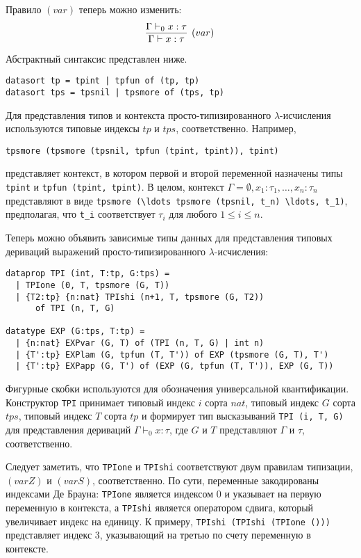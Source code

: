 Правило $(var)$ теперь можно изменить:
$$
\infer[(var)]{\Gamma \vdash x:\tau}{\Gamma \vdash_0 x:\tau}
$$

Абстрактный синтаксис представлен ниже.

\begin{lstlisting}[basicstyle=\small]
datasort tp = tpint | tpfun of (tp, tp)
datasort tps = tpsnil | tpsmore of (tps, tp)
\end{lstlisting}

Для представления типов и контекста просто-типизированного $\lambda$-исчисления используются типовые индексы $tp$ и $tps$, соответственно. Например,
\begin{lstlisting}
tpsmore (tpsmore (tpsnil, tpfun (tpint, tpint)), tpint)
\end{lstlisting}
представляет контекст, в котором первой и второй переменной назначены типы \lstinline!tpint! и \lstinline!tpfun (tpint, tpint)!. В целом, контекст $\Gamma = \emptyset, x_1:\tau_1, \ldots, x_n:\tau_n$ представляют в виде \lstinline!tpsmore (\ldots tpsmore (tpsnil, t_n) \ldots, t_1)!, предполагая, что \lstinline!t_i! соответствует $\tau_i$ для любого $1 \leq i \leq n$.

Теперь можно объявить зависимые типы данных для представления типовых дериваций выражений просто-типизированного $\lambda$-исчисления:

\begin{lstlisting}
dataprop TPI (int, T:tp, G:tps) =
  | TPIone (0, T, tpsmore (G, T))
  | {T2:tp} {n:nat} TPIshi (n+1, T, tpsmore (G, T2))
      of TPI (n, T, G)

datatype EXP (G:tps, T:tp) =
  | {n:nat} EXPvar (G, T) of (TPI (n, T, G) | int n)
  | {T':tp} EXPlam (G, tpfun (T, T')) of EXP (tpsmore (G, T), T')
  | {T':tp} EXPapp (G, T') of (EXP (G, tpfun (T, T')), EXP (G, T))
\end{lstlisting}

Фигурные скобки используются для обозначения универсальной квантификации. Конструктор \lstinline!TPI! принимает типовый индекс $i$ сорта $nat$, типовый индекс $G$ сорта $tps$, типовый индекс $T$ сорта $tp$ и формирует тип высказываний \lstinline!TPI (i, T, G)! для представления дериваций $\Gamma \vdash_0 x:\tau$, где $G$ и $T$ представляют $\Gamma$ и $\tau$, соответственно.

Следует заметить, что \lstinline!TPIone! и \lstinline!TPIshi! соответствуют двум правилам типизации, $(varZ)$ и $(varS)$, соответственно. По сути, переменные закодированы индексами Де Брауна: \lstinline!TPIone! является индексом 0 и указывает на первую переменную в контекста, а \lstinline!TPIshi! является оператором сдвига, который увеличивает индекс на единицу. К примеру, \lstinline!TPIshi (TPIshi (TPIone ()))! представляет индекс 3, указывающий на третью по счету переменную в контексте.

